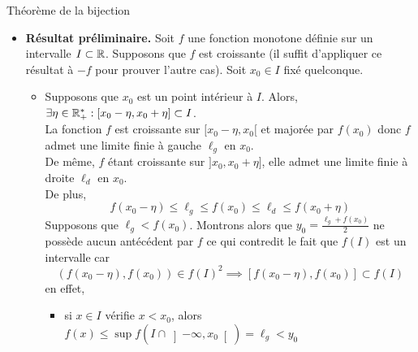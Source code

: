 \documentclass{article}
\begin{document}
\begin{question_kholle}
	{Théorème de la bijection}
	\hfill\\
	\begin{itemize}[label=$\vartriangleright$]
		\item \textbf{Résultat préliminaire.} Soit $f$ une fonction monotone définie sur un intervalle $I\subset\mathbb R$.
		      Supposons que $f$ est croissante (il suffit d’appliquer ce résultat à $-f$ pour prouver l’autre cas). Soit $x_{0}\in I$ fixé quelconque.\\
		      \begin{itemize}[label=$\star$]
			      \item
			            Supposons que $x_{0}$ est un point intérieur à $I$. Alors, $\exists\eta\in\mathbb R_{+}^{*}: [x_{0}-\eta,x_{0}+\eta]\subset I$.\\
			            La fonction $f$ est croissante sur $[x_{0}-\eta,x_{0}[$ et majorée par $f(x_{0})$ donc $f$ admet une limite finie à gauche $\ell_{g}$ en $x_{0}$.\\
			            De même, $f$ étant croissante sur $]x_{0}, x_{0}+\eta]$, elle admet une limite finie à droite $\ell_{d}$ en $x_{0}$.\\
			            De plus,
			            \begin{equation*}
				            f(x_{0}-\eta)\leq \ell_{g} \leq f(x_{0})\leq \ell_{d} \leq f(x_{0}+\eta)
			            \end{equation*}
			            Supposons que $\ell_{g}<f(x_{0})$. Montrons alors que $y_{0}=\frac{\ell_{g}+f(x_{0})}{2}$ ne possède aucun antécédent par $f$ ce qui contredit le fait que $f(I)$ est un intervalle car
			            \begin{equation*}
				            \left(f(x_{0}-\eta), f(x_{0})\right)\in f(I)^{2} \implies  \left[f(x_{0}-\eta), f(x_{0})\right]\subset f(I)
			            \end{equation*}
			            en effet,
			            \begin{itemize}
				            \item si $x\in I$ vérifie $x<x_{0}$, alors $f(x)\leq \sup f(I\cap \left]-\infty,x_{0}\right[)=\ell_{g}<y_{0}$

\end{itemize}
\end{itemize}
\end{itemize}
\end{question_kholle}
\end{document}
